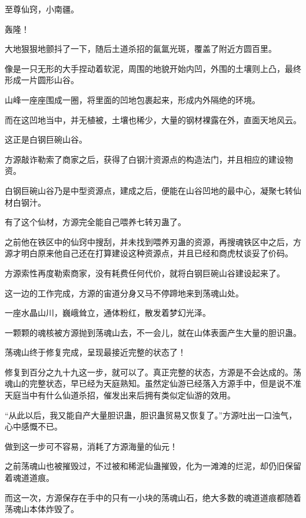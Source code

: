
\begin{this_body}

至尊仙窍，小南疆。

轰隆！

大地狠狠地颤抖了一下，随后土道杀招的氤氲光斑，覆盖了附近方圆百里。

像是一只无形的大手捏动着软泥，周围的地貌开始内凹，外围的土壤则上凸，最终形成一片圆形山谷。

山峰一座座围成一圈，将里面的凹地包裹起来，形成内外隔绝的环境。

而在这凹地当中，并无植被，土壤也稀少，大量的钢材裸露在外，直面天地风云。

这正是白钢巨碗山谷。

方源敲诈勒索了商家之后，获得了白钢汁资源点的构造法门，并且相应的建设物资。

白钢巨碗山谷乃是中型资源点，建成之后，便能在山谷凹地的最中心，凝聚七转仙材白钢汁。

有了这个仙材，方源完全能自己喂养七转刃蛊了。

之前他在铁区中的仙窍中搜刮，并未找到喂养刃蛊的资源，再搜魂铁区中之后，方源才明白原来他自己还在打算建设这种资源点，并且已经和商虎杖谈妥了价码。

方源索性再度勒索商家，没有耗费任何代价，就将白钢巨碗山谷建设起来了。

这一边的工作完成，方源的宙道分身又马不停蹄地来到荡魂山处。

一座水晶山川，巍峨耸立，通体粉红，散发着梦幻光泽。

一颗颗的魂核被方源抛到荡魂山去，不一会儿，就在山体表面产生大量的胆识蛊。

荡魂山终于修复完成，呈现最接近完整的状态了！

修复到百分之九十九这一步，就可以了。真正完整的状态，方源是不会达成的。荡魂山的完整状态，早已经为天庭熟知。虽然定仙游已经落入方源手中，但是说不准天庭当中有什么仙道杀招，催发出来后拥有类似定仙游的效用。

“从此以后，我又能自产大量胆识蛊，胆识蛊贸易又恢复了。”方源吐出一口浊气，心中感慨不已。

做到这一步可不容易，消耗了方源海量的仙元！

之前荡魂山也被摧毁过，不过被和稀泥仙蛊摧毁，化为一滩滩的烂泥，却仍旧保留着魂道道痕。

而这一次，方源保存在手中的只有一小块的荡魂山石，绝大多数的魂道道痕都随着荡魂山本体炸毁了。


\end{this_body}
